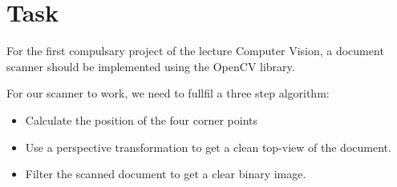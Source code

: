 \chapter{Task}

For the first compulsary project of the lecture Computer Vision, a document scanner should be implemented using the OpenCV library.

For our scanner to work, we need to fullfil a three step algorithm:
\begin{itemize}
    \item Calculate the position of the four corner points
    \item Use a perspective transformation to get a clean top-view of the document.
    \item Filter the scanned document to get a clear binary image.
\end{itemize}